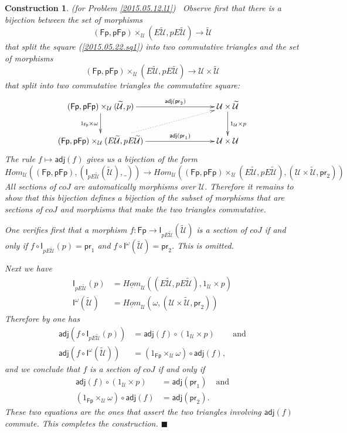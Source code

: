 \documentclass[12pt]{article}
\numberwithin{equation}{section}
\newtheorem{construction0}[proposition]{Construction}
\newenvironment{construction}[1]{\begin{construction0}(for Problem \ref{#1})\ }{$\blacksquare$ \end{construction0}}
\newcommand{\sr}{\rightarrow}
\newcommand{\uu}{\underline}
\newcommand{\iHom}{\uu{Hom}}
\newcommand{\wt}{\widetilde}
\newcommand{\id}{1}            %
\newcommand{\U}{\mathcal{U}}
\newcommand{\I}{\mathsf{I}}
\newcommand{\Fp}{\mathsf{Fp}}
\newcommand{\pFp}{\mathsf{pFp}}
\newcommand{\pr}{\mathsf{pr}}
\newcommand{\adj}{\mathsf{adj}}
\begin{document}
\begin{construction}{2015.05.12.l1}\rm
\label{2015.05.22.constr1} Observe first that there is a bijection between the
set of morphisms
%
$$(\Fp,\pFp)\times_\U(E\wt{\U},pE\wt{\U})\sr \wt{\U}$$
%
that split the square (\ref{2015.05.22.sq1}) into two commutative triangles and
the set of morphisms
%
$$(\Fp,\pFp)\times_\U(E\wt{\U},pE\wt{\U})\sr \U\times\wt{\U}$$
%
that split into two commutative triangles the commutative square:
%
$$
\begin{xy}
          \xymatrix@C=7pc{ (\Fp,\pFp)\times_\U(\wt{\U},p) \ar[r]^-{\adj(\pr_2)}
            \ar[d]_{\id_{\Fp}\times \omega} & \U\times \wt{\U} \ar[d]^{\id_\U\times
              p}\\ (\Fp,\pFp)\times_\U(E\wt{\U},pE\wt{\U}) \ar[r]^-{\adj(\pr_1)} \ar@{.>}[ur] &
            \U\times \U }
\end{xy}
$$
%
The rule $f\mapsto \adj(f)$ gives us a bijection of the form
%
$$Hom_\U((\Fp,\pFp),(\I_{pE\wt{\U}}(\wt{\U}),\_))\sr Hom_\U((\Fp,\pFp)\times_\U
(E\wt{\U},pE\wt{\U}), (\U\times\wt{\U}, \pr_2))$$
%
All sections of $coJ$ are automatically morphisms over $\U$. Therefore it
remains to show that this bijection defines a bijection of the subset of
morphisms that are sections of $coJ$ and morphisms that make the two triangles
commutative.

One verifies first that a morphism $f:\Fp\sr \I_{pE\wt{\U}}(\wt{\U})$ is a section
of $coJ$ if and only if $f\circ \I_{pE\wt{\U}}(p)=\pr_1$ and $f\circ
\I^{\omega}(\wt{\U})=\pr_2$. This is omitted.

Next we have
%
\begin{align*}
  \I_{pE\wt{\U}}(p)&=\iHom_\U((E\wt{\U},pE\wt{\U}),\id_\U\times p) \\
  \I^{\omega}(\wt{\U})&=\iHom_\U(\omega,(\U\times\wt{\U},\pr_2))
\end{align*}
%
Therefore by \cite[Lemma 4.1.7]{presheavesOb} one has
%
\begin{align*}
  \adj(f\circ \I_{pE\wt{\U}}(p))&=\adj(f)\circ (\id_\U\times p) & \text{and} \\
  \adj(f\circ \I^{\omega}(\wt{\U}))&=(\id_{\Fp}\times_{\U}\omega)\circ \adj(f),
\end{align*}
%
and we conclude that $f$ is a section of $coJ$ if and only if
%
\begin{align*}
  \adj(f)\circ (\id_\U\times p)&=\adj(\pr_1) & \text{and} \\
  (\id_{\Fp}\times_{\U}\omega)\circ \adj(f)&=\adj(\pr_2).
\end{align*}
% 
These two equations are the ones that assert the two triangles involving $\adj(f)$ commute.
This completes the construction.
\end{construction}
\end{document}
